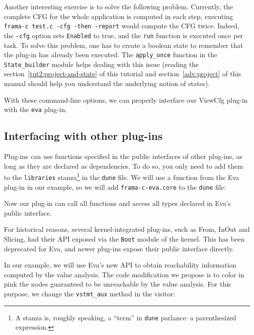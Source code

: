 Another interesting exercise is to solve the following problem.
Currently, the complete CFG for the whole application is computed in
each \framac step, \ie executing \texttt{frama-c test.c -cfg
  -then -report} would compute the CFG twice. Indeed, the
\texttt{-cfg} option sets \texttt{Enabled} to true, and the
\texttt{run} function is executed once per task. To solve this
problem, one has to create a boolean state to remember that the plug-in
has already been executed. The \texttt{apply\_once} function in the
\texttt{State\_builder} module helps dealing with this issue (reading
the section~\ref{tut2:project-and-state} of this tutorial and
section~\ref{adv:project} of this manual should help you understand the
underlying notion of states).

With these command-line options, we can properly interface our ViewCfg plug-in
with the \texttt{eva} plug-in.

\subsection{Interfacing with other plug-ins}

Plug-ins can use functions specified in the public interfaces of other
plug-ins, as long as they are declared as dependencies. To do so, you only
need to add them to the \texttt{libraries} stanza\footnote{A stanza is,
roughly speaking, a ``term'' in \texttt{dune} parlance: a parenthesized
expression.} in the \texttt{dune} file.
We will use a function from the \textsf{Eva} plug-in in our example,
so we will add \texttt{frama-c-eva.core} to the \texttt{dune} file:


Now our plug-in can call all functions and access all types declared in
\textsf{Eva}'s public interface.

For historical reasons, several kernel-integrated plug-ins, such as
\textsf{From}, \textsf{InOut} and \textsf{Slicing}, had their API exposed
via the \texttt{Boot} module of the \framac kernel. This has been deprecated
for \textsf{Eva}, and newer plug-ins expose their public interface directly.

In our example, we will use \textsf{Eva}'s new API to obtain reachability
information computed by the value analysis.
The code modification we propose is to color in pink the nodes guaranteed to
be unreachable by the value analysis. For this purpose, we change the
\texttt{vstmt\_aux} method in the visitor:

